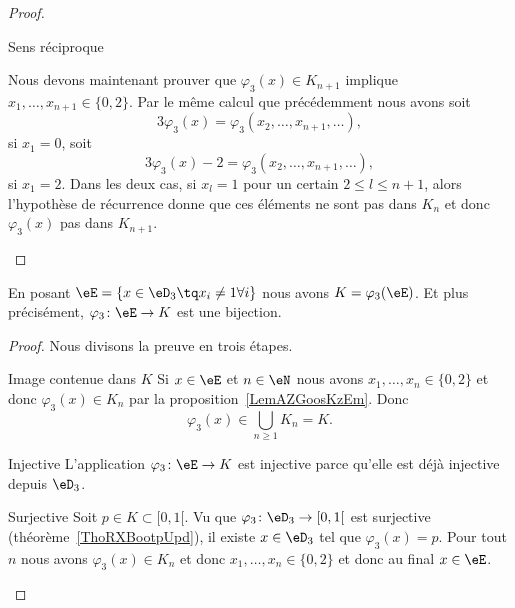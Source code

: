 \begin{proof}
\begin{subproof}
        \item[Sens réciproque]

            Nous devons maintenant prouver que \( \varphi_3(x)\in K_{n+1}\) implique \( x_1,\ldots, x_{n+1}\in\{ 0,2 \}\). Par le même calcul que précédemment nous avons soit
            \begin{equation}
                3\varphi_3(x)=\varphi_3(x_2,\ldots, x_{n+1},\ldots),
            \end{equation}
            si \( x_1=0\), soit
            \begin{equation}
                3\varphi_3(x)-2=\varphi_3(x_2,\ldots, x_{n+1},\ldots),
            \end{equation}
            si \( x_1=2\). Dans les deux cas, si \( x_l=1\) pour un certain \( 2\leq l\leq n+1\), alors l'hypothèse de récurrence donne que ces éléments ne sont pas dans \( K_n\) et donc \( \varphi_3(x)\) pas dans \( K_{n+1}\).

        \end{subproof}
\end{proof}

\begin{corollary}   \label{CorSEDooJmeXt}
    En posant \( \eE=\{ x\in\eD_3\tq x_i\neq 1\forall i \}\) nous avons \( K=\varphi_3(\eE)\). Et plus précisément, \( \varphi_3\colon \eE\to K\) est une bijection.
\end{corollary}

\begin{proof}
    Nous divisons la preuve en trois étapes.
    \begin{subproof}
    \item[Image contenue dans \( K\)]
        Si \( x\in \eE\) et \( n\in \eN\) nous avons \( x_1,\ldots, x_n\in\{ 0,2 \}\) et donc \( \varphi_3(x)\in K_n\) par la proposition~\ref{LemAZGoosKzEm}. Donc
        \begin{equation}
            \varphi_3(x)\in\bigcup_{n\geq 1}K_n=K.
        \end{equation}
    \item[Injective]
        L'application \( \varphi_3\colon \eE\to K\) est injective parce qu'elle est déjà injective depuis \( \eD_3\).
    \item[Surjective]
        Soit \( p\in K\subset\mathopen[ 0 , 1 [\). Vu que \( \varphi_3\colon \eD_3\to \mathopen[ 0 , 1 [\) est surjective (théorème~\ref{ThoRXBootpUpd}), il existe \( x\in \eD_3\) tel que \( \varphi_3(x)=p\). Pour tout \( n\) nous avons \( \varphi_3(x)\in K_n\) et donc \( x_1,\ldots, x_n\in\{ 0,2 \}\) et donc au final \( x\in \eE\).
    \end{subproof}
\end{proof}

